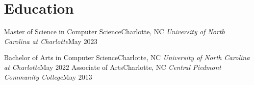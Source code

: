 \section{Education}
  \resumeSubHeadingListStart

    \resumeSubheading
      {\color{blue}Master of Science in Computer Science}{Charlotte, NC}
      {\it{}University of North Carolina at Charlotte}{May 2023}
      \resumeItemListStart
      \resumeItemListEnd

    \vspace{-5pt}

    \resumeSubheading
      {\color{blue}Bachelor of Arts in Computer Science}{Charlotte, NC}
      {\it{}University of North Carolina at Charlotte}{May 2022}
      \resumeItemListStart
      \resumeItemListEnd
    \vspace{-5pt}
    \resumeSubheading
      {\color{blue}Associate of Arts}{Charlotte, NC}
      {\it{}Central Piedmont Community College}{May 2013}
      \resumeItemListStart

      \resumeItemListEnd  
      
  \resumeSubHeadingListEnd
